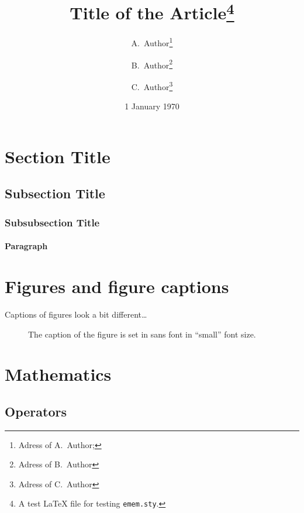 \documentclass[11pt]{article}
\title{Title of the Article\thanks{A test {\LaTeX} file for testing \texttt{emem.sty}.}}
\author{%
  A.~Author\thanks{Adress of A.~Author; \email{a.author@mail.zz}} \and%
  B.~Author\thanks{Adress of B.~Author} \and%
  C.~Author\thanks{Adress of C.~Author}%
}
\date{1 January 1970}
\begin{document}
\maketitle

\begin{abstract}
  \lipsum[1]
\end{abstract}

\section{Section Title}
\lipsum[1]

\subsection{Subsection Title}
\lipsum[1]

\subsubsection{Subsubsection Title}
\lipsum[1]

\paragraph{Paragraph}
\lipsum[1]

\section{Figures and figure captions}

Captions of figures look a bit different\ldots
\begin{figure}[h]
  \begin{center}
  \end{center}
  \caption{The caption of the figure is set in sans font in ``small'' font size.}
\end{figure}

\section{Mathematics}

\subsection{Operators}
\end{document}
